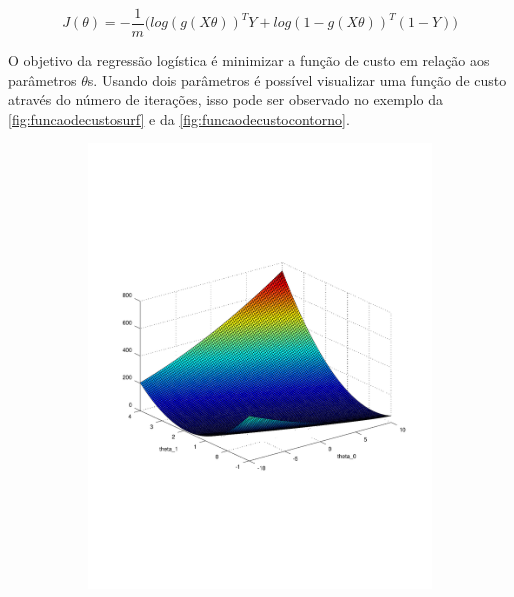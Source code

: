 \begin{equation}
J(\theta) = - \frac{1}{m}\Big( log(g(X\theta))^TY + log(1 - g(X\theta))^T(1 - Y) \Big) \label{eq:funcaodecustovet}
\end{equation}

O objetivo da regressão logística é minimizar a função de custo em relação aos parâmetros $\theta$s. Usando dois parâmetros é possível visualizar uma função de custo através do número de iterações, isso pode ser observado no exemplo da \autoref{fig:funcaodecustosurf} e da \autoref{fig:funcaodecustocontorno}. 


\begin{figure}
  \caption{Função de custo - $J(\theta_0, \theta_1)$}
  \begin{subfigure}[htb]{0.5\textwidth} \label{fig:funcaodecustosurf}
    \includegraphics[width=\textwidth]{img/funcaodecustosurf} 
  \end{subfigure} 
  \begin{subfigure}[htb]{0.5\textwidth} \label{fig:funcaodecustocontorno}

\end{subfigure}
\end{figure}
